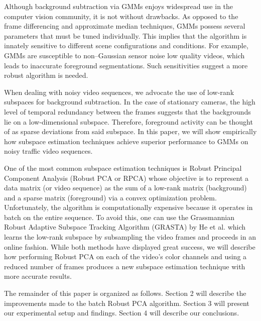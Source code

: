 \documentclass{article}
\begin{document}
Although background subtraction via GMMs enjoys widespread use in the computer vision community, it is not without drawbacks. As opposed to the frame differencing and approximate median techniques, GMMs possess several parameters that must be tuned individually. This implies that the algorithm is innately sensitive to different scene configurations and conditions. For example, GMMs are susceptible to non--Gaussian sensor noise low quality videos, which leads to inaccurate foreground segmentations. Such sensitivities suggest a more robust algorithm is needed.


When dealing with noisy video sequences, we advocate the use of low-rank subspaces for background subtraction.  %
In the case of stationary cameras, the high level of temporal redundancy between the frames suggests that the backgrounds lie on a low-dimensional subspace. Therefore, foreground activity can be thought of as sparse deviations from said subspace. In this paper, we will show empirically how subspace estimation techniques achieve superior performance to GMMs on noisy traffic video sequences. 

One of the most common subspace estimation techniques is Robust Principal Component Analysis (Robust PCA or RPCA) \cite{RPCA09} whose objective is to represent a data matrix (or video sequence) as the sum of a low-rank matrix (background) and a sparse matrix (foreground) via a convex optimization problem. Unfortunately, the algorithm is computationally expensive because it operates in batch on the entire sequence. To avoid this, one can use the Grassmannian Robust Adaptive Subspace Tracking Algorithm (GRASTA) by He et al. \cite{GRASTA12} which learns the low-rank subspace by subsampling the video frames and proceeds in an online fashion. While both methods have displayed great success, we will describe how performing Robust PCA on each of the video's color channels and using a reduced number of frames produces a new subspace estimation technique with more accurate results. 


The remainder of this paper is organized as follows. Section 2 will describe the improvements made to the batch Robust PCA algorithm. Section 3 will present our experimental setup and findings. Section 4 will describe our conclusions.
\end{document}
